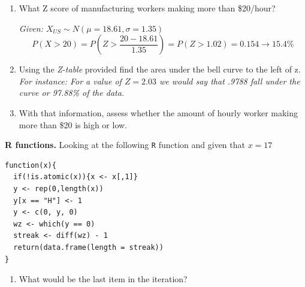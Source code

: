 \documentclass[12pt]{article}
\newcommand{\soln}[2]{\textit{\textcolor{custom_red}{#2}}}{}
\newcommand{\qt}[1]{\textcolor{custom_carnelian}{\textbf{#1.}}}
\begin{document}
\begin{enumerate}

\item What Z score of manufacturing workers making more than \$20/hour?

\soln{3.5cm}{
Given: $X_{US} \sim N(\mu = 18.61, \sigma = 1.35)$
\[ P(X > 20) = P\left( Z > \frac{20 - 18.61}{1.35} \right) = P(Z > 1.02) = 0.154 \rightarrow 15.4\% \]
}


\item Using the \textit{Z-table} provided find the area under the bell curve to the left of z. \textit{For instance: For a value of $Z = 2.03$ we would say that .9788 fall under the curve or 97.88\% of the data.} 
\vspace{3cm}
\item With that information, assess whether the amount of hourly worker making more than \$20 is high or low. 
\end{enumerate}
\vspace{3cm}
%
%
%
\qt{R functions} Looking at the following \texttt{R} function and given that $x = 17$ 
\begin{verbatim}
function(x){
  if(!is.atomic(x)){x <- x[,1]}
  y <- rep(0,length(x))
  y[x == "H"] <- 1
  y <- c(0, y, 0)
  wz <- which(y == 0)
  streak <- diff(wz) - 1
  return(data.frame(length = streak))
}
\end{verbatim}

\begin{enumerate}
\item What would be the last item in the iteration?
\end{enumerate}
\end{document}
